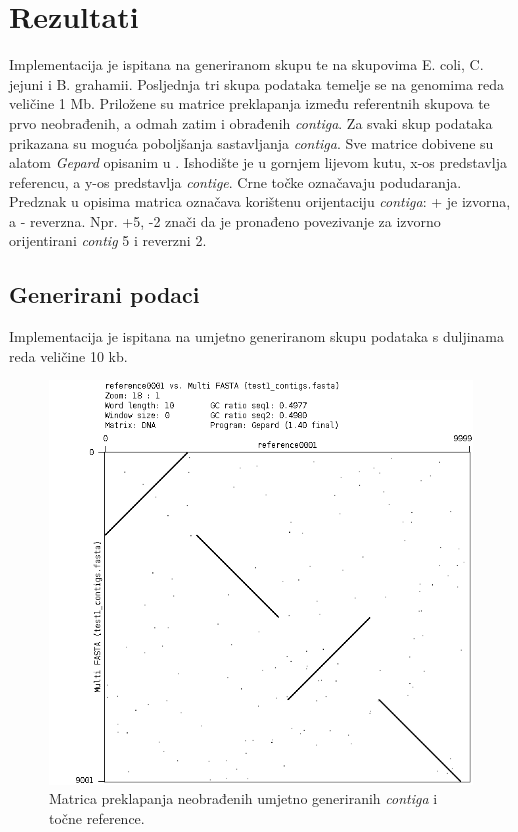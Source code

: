 \documentclass[times, utf8, seminar, numeric]{fer}
\begin{document}
\chapter{Rezultati}
Implementacija je ispitana na generiranom skupu te na skupovima E. coli, C. jejuni i B. grahamii. Posljednja tri skupa podataka temelje se na genomima reda veličine 1 Mb. Priložene su matrice preklapanja između referentnih skupova te prvo neobrađenih, a odmah zatim i obrađenih \textit{contiga}. Za svaki skup podataka prikazana su moguća poboljšanja sastavljanja \textit{contiga}. Sve matrice dobivene su alatom \textit{Gepard} opisanim u \cite{gepard}. Ishodište je u gornjem lijevom kutu, x-os predstavlja referencu, a y-os predstavlja \textit{contige}. Crne točke označavaju podudaranja. Predznak u opisima matrica označava korištenu orijentaciju \textit{contiga}: + je izvorna, a - reverzna. Npr. +5, -2 znači da je pronađeno povezivanje za izvorno orijentirani \textit{contig} 5 i reverzni 2.

\section{Generirani podaci}
Implementacija je ispitana na umjetno generiranom skupu podataka s duljinama reda veličine 10 kb.

\begin{figure}[h]
	\centering
	\centerline{\includegraphics[width=0.7\linewidth]{img/generated}}
	\caption{Matrica preklapanja neobrađenih umjetno generiranih \textit{contiga} i točne reference.}
	\label{fig:generated}
\end{figure}
\end{document}
